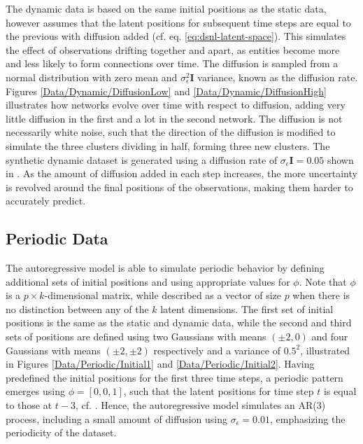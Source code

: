     The dynamic data is based on the same initial positions as the static data, however assumes that the latent positions for subsequent time steps are equal to the previous with diffusion added (cf. eq. \ref{eq:dsnl-latent-space}). This simulates the effect of observations drifting together and apart, as entities become more and less likely to form connections over time. The diffusion is sampled from a normal distribution with zero mean and $\sigma_\epsilon^2\bm{I}$ variance, known as the diffusion rate. Figures \ref{Data/Dynamic/DiffusionLow} and \ref{Data/Dynamic/DiffusionHigh} illustrates how networks evolve over time with respect to diffusion, adding very little diffusion in the first and a lot in the second network.
    The diffusion is not necessarily white noise, such that the direction of the diffusion is modified to simulate the three clusters dividing in half, forming three new clusters.
    The synthetic dynamic dataset is generated using a diffusion rate of $\sigma_\epsilon\bm{I}=0.05$ shown in . 
    As the amount of diffusion added in each step increases, the more uncertainty is revolved around the final positions of the observations, making them harder to accurately predict.

\subsection{Periodic Data}

    The autoregressive model is able to simulate periodic behavior by defining additional sets of initial positions and using appropriate values for $\phi$. Note that $\phi$ is a $p\times k$-dimensional matrix, while described as a vector of size $p$ when there is no distinction between any of the $k$ latent dimensions.
    The first set of initial positions is the same as the static and dynamic data, while the second and third sets of positions are defined using two Gaussians with means $(\pm2,0)$ and four Gaussians with means $(\pm2,\pm2)$ respectively and a variance of $0.5^2$, illustrated in Figures \ref{Data/Periodic/Initial1} and \ref{Data/Periodic/Initial2}.
    Having predefined the initial positions for the first three time steps, a periodic pattern emerges using $\phi=[0, 0, 1]$, such that the latent positions for time step $t$ is equal to those at $t-3$, cf. .
    Hence, the autoregressive model simulates an AR(3) process, including a small amount of diffusion using $\sigma_\epsilon=0.01$, emphasizing the periodicity of the dataset.
    
